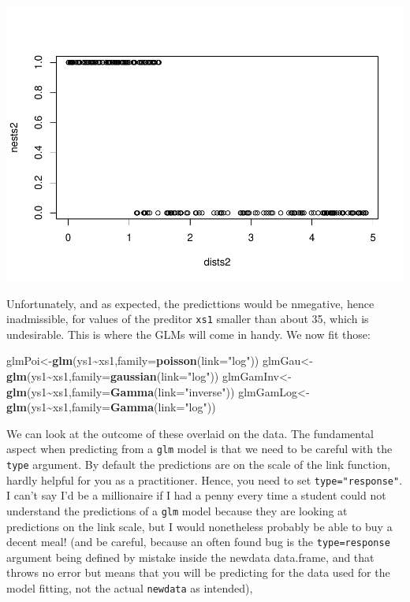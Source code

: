\documentclass[
]{book}
\newenvironment{Shaded}{\begin{snugshade}}{\end{snugshade}}
\newcommand{\AttributeTok}[1]{\textcolor[rgb]{0.13,0.29,0.53}{#1}}
\newcommand{\FunctionTok}[1]{\textcolor[rgb]{0.13,0.29,0.53}{\textbf{#1}}}
\newcommand{\NormalTok}[1]{#1}
\newcommand{\OtherTok}[1]{\textcolor[rgb]{0.56,0.35,0.01}{#1}}
\newcommand{\SpecialCharTok}[1]{\textcolor[rgb]{0.81,0.36,0.00}{\textbf{#1}}}
\newcommand{\StringTok}[1]{\textcolor[rgb]{0.31,0.60,0.02}{#1}}
\begin{document}
\includegraphics{ECOMODbook_files/figure-latex/unnamed-chunk-9-1.pdf}

Unfortunately, and as expected, the predicttions would be nmegative, hence inadmissible, for values of the preditor \texttt{xs1} smaller than about 35, which is undesirable. This is where the GLMs will come in handy. We now fit those:

\begin{Shaded}
\begin{Highlighting}[]
\NormalTok{glmPoi}\OtherTok{\textless{}{-}}\FunctionTok{glm}\NormalTok{(ys1}\SpecialCharTok{\textasciitilde{}}\NormalTok{xs1,}\AttributeTok{family=}\FunctionTok{poisson}\NormalTok{(}\AttributeTok{link=}\StringTok{"log"}\NormalTok{))}
\NormalTok{glmGau}\OtherTok{\textless{}{-}}\FunctionTok{glm}\NormalTok{(ys1}\SpecialCharTok{\textasciitilde{}}\NormalTok{xs1,}\AttributeTok{family=}\FunctionTok{gaussian}\NormalTok{(}\AttributeTok{link=}\StringTok{"log"}\NormalTok{))}
\NormalTok{glmGamInv}\OtherTok{\textless{}{-}}\FunctionTok{glm}\NormalTok{(ys1}\SpecialCharTok{\textasciitilde{}}\NormalTok{xs1,}\AttributeTok{family=}\FunctionTok{Gamma}\NormalTok{(}\AttributeTok{link=}\StringTok{"inverse"}\NormalTok{))}
\NormalTok{glmGamLog}\OtherTok{\textless{}{-}}\FunctionTok{glm}\NormalTok{(ys1}\SpecialCharTok{\textasciitilde{}}\NormalTok{xs1,}\AttributeTok{family=}\FunctionTok{Gamma}\NormalTok{(}\AttributeTok{link=}\StringTok{"log"}\NormalTok{))}
\end{Highlighting}
\end{Shaded}

We can look at the outcome of these overlaid on the data. The fundamental aspect when predicting from a \texttt{glm} model is that we need to be careful with the \texttt{type} argument. By default the predictions are on the scale of the link function, hardly helpful for you as a practitioner. Hence, you need to set \texttt{type="response"}. I can't say I'd be a millionaire if I had a penny every time a student could not understand the predictions of a \texttt{glm} model because they are looking at predictions on the link scale, but I would nonetheless probably be able to buy a decent meal! (and be careful, because an often found bug is the \texttt{type=response} argument being defined by mistake inside the newdata data.frame, and that throws no error but means that you will be predicting for the data used for the model fitting, not the actual \texttt{newdata} as intended),
\end{document}
